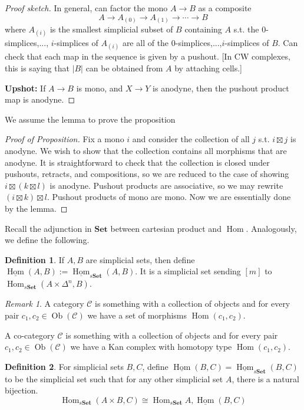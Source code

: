 \documentclass{article}
\theoremstyle{definition}
\newtheorem{defn}{Definition}[section]
\theoremstyle{remark}
\newtheorem{rem}{Remark}
\theoremstyle{plain}
\newtheorem{prop}[defn]{Proposition}
\newcommand{\Hom}{\operatorname{Hom}}
\newcommand{\bset}{\mathbf{Set}}
\begin{document}
\begin{proof}[Proof sketch]
    In general, can factor the mono $A\to B$ as a composite
    \[A\to A_{(0)}\to A_{(1)}\to\cdots\to B\]
    where $A_{(i)}$ is the smallest simplicial subset of $B$ containing $A$ s.t. the $0$-simplices,..., $i$-simplices of $A_{(i)}$ are all of the $0$-simplices,...,$i$-simplices of $B$. Can check that each map in the sequence is given by a pushout. [In CW complexes, this is saying that $|B|$ can be obtained from $A$ by attaching cells.]

    \textbf{Upshot:} If $A\to B$ is mono, and $X\to Y$ is anodyne, then the pushout product map is anodyne.
\end{proof}

We assume the lemma to prove the proposition
\begin{proof}[Proof of Proposition]
    Fix a mono $i$ and consider the collection of all $j$ s.t. $i\boxtimes j $ is anodyne. We wish to show that the collection contains all morphisms that are anodyne. It is straightforward to check that the collection is closed under pushouts, retracts, and compositions, so we are reduced to the case of showing $i\boxtimes (k\boxtimes l)$ is anodyne. Pushout products are associative, so we may rewrite $(i\boxtimes k)\boxtimes l$. Pushout products of mono are mono. Now we are essentially done by the lemma.
\end{proof}

Recall the adjunction in $\bset$ between cartesian product and $\Hom$. Analogously, we define the following.

\begin{defn}
    If $A,B$ are simplicial sets, then define $\underline{\Hom}(A,B):=\underline{\Hom}_{s\bset}(A,B)$. It is a simplicial set sending $[m]$ to $\Hom_{s\bset}(A\times\Delta^n,B)$.
\end{defn}
\begin{rem}
    A category $\mathscr C$ is something with a collection of objects and for every pair $c_1,c_2\in\operatorname{Ob}(\mathscr C)$ we have a set of morphisms $\Hom(c_1,c_2)$.

    A co-category $\mathscr C$ is something with a collection of objects and for every pair $c_1,c_2\in\operatorname{Ob}(\mathscr C)$ we have a Kan complex with homotopy type $\Hom(c_1,c_2)$.
\end{rem}

\begin{defn}
    For simplicial sets $B,C$, define $\underline{\Hom}(B,C)=\underline{\Hom}_{s\bset}(B,C)$ to be the simplicial set such that for any other simplicial set $A$, there is a natural bijection.
    \[\Hom_{s\bset}(A\times B,C)\cong\Hom_{s\bset}A,\underline{\Hom}(B,C)\]
\end{defn}
\end{document}
